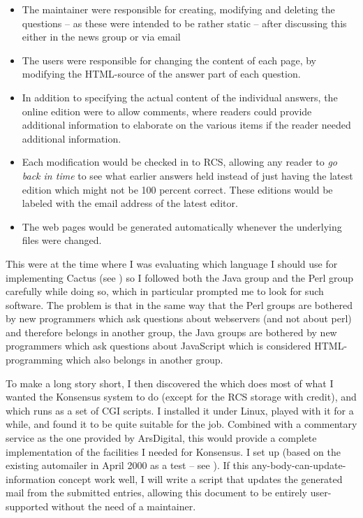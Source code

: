 \begin{itemize}
\item The maintainer were responsible for creating, modifying and
  deleting the questions -- as these were intended to be rather static
  -- after discussing this either in the news group or via email
\item The users were responsible for changing the content of each
  page, by modifying the HTML-source of the answer part of each
  question.

\item In addition to specifying the actual content of the individual
  answers, the online edition were to allow comments, where readers
  could provide additional information to elaborate on the various
  items if the reader needed additional information.
  
\item Each modification would be checked in to RCS, allowing any
  reader to \textit{go back in time} to see what earlier answers held
  instead of just having the latest edition which might not be 100
  percent correct.  These editions would be labeled with the email
  address of the latest editor.
  
\item The web pages would be generated automatically whenever the
  underlying files were changed.
  
\end{itemize}

This were at the time where I was evaluating which language I should
use for implementing Cactus (see ) so I
followed both the Java group and the Perl group carefully while doing
so, which in particular prompted me to look for such software.  The
problem is that in the same way that the Perl groups are bothered by
new programmers which ask questions about webservers (and not about
perl) and therefore belongs in another group, the Java groups are
bothered by new programmers which ask questions about JavaScript which
is considered HTML-programming which also belongs in another group.


To make a long story short, I then discovered the
which does most of what I wanted the Konsensus system to do (except
for the RCS storage with credit), and which runs as a set of CGI
scripts.  I installed it under Linux, played with it for a while, and
found it to be quite suitable for the job.  Combined with a commentary
service as the one provided by ArsDigital, this would provide a
complete implementation of the facilities I needed for Konsensus.  I
set up  (based on the existing
automailer in April 2000 as a test -- see
).  If this
any-body-can-update-information concept work well, I will write a
script that updates the generated mail from the submitted entries,
allowing this document to be entirely user-supported without the need
of a maintainer.

  
